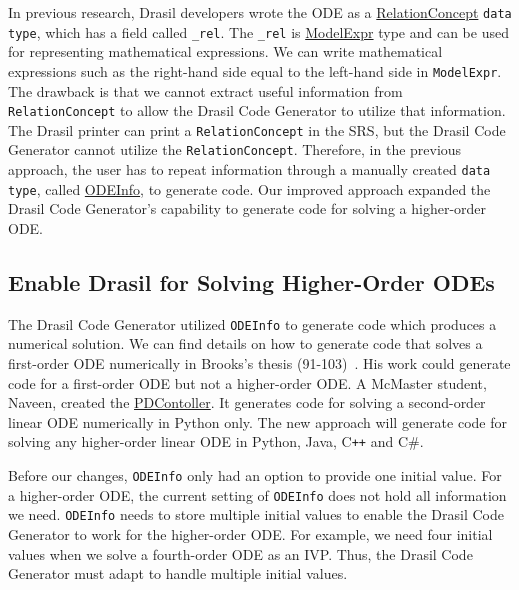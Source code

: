 In previous research, Drasil developers wrote the ODE as a \href{https://jacquescarette.github.io/Drasil/docs/full/drasil-lang-0.1.60.0/Language-Drasil-Chunk-Relation.html#t:RelationConcept}{RelationConcept} \verb|data type|, which has a field called \verb|_rel|. The \verb|_rel| is \href{https://jacquescarette.github.io/Drasil/docs/full/drasil-lang-0.1.60.0/Language-Drasil-ModelExpr-Lang.html#t:ModelExpr}{ModelExpr} type and can be used for representing mathematical expressions. We can write mathematical expressions such as the right-hand side equal to the left-hand side in \verb|ModelExpr|. The drawback is that we cannot extract useful information from \verb|RelationConcept| to allow the Drasil Code Generator to utilize that information. The Drasil printer can print a \verb|RelationConcept| in the SRS, but the Drasil Code Generator cannot utilize the \verb|RelationConcept|. Therefore, in the previous approach, the user has to repeat information through a manually created \verb|data type|, called \href{https://jacquescarette.github.io/Drasil/docs/drasil-code-0.1.9.0/Language-Drasil-Code.html#t:ODEInfo}{ODEInfo}, to generate code. Our improved approach expanded the Drasil Code Generator's capability to generate code for solving a higher-order ODE.

\subsection{Enable Drasil for Solving Higher-Order ODEs}
The Drasil Code Generator utilized \verb|ODEInfo| to generate code which produces a numerical solution. We can find details on how to generate code that solves a first-order ODE numerically in Brooks's thesis (91-103)~\citep{brooks}. His work could generate code for a first-order ODE but not a higher-order ODE. A McMaster student, Naveen, created the \href{https://jacquescarette.github.io/Drasil/examples/pdcontroller/SRS/srs/PDController_SRS.html}{PDContoller}. It generates code for solving a second-order linear ODE numerically in Python only. The new approach will generate code for solving any higher-order linear ODE in Python, Java, C\texttt{++} and C\#.

Before our changes, \verb|ODEInfo| only had an option to provide one initial value. For a higher-order ODE, the current setting of \verb|ODEInfo| does not hold all information we need. \verb|ODEInfo| needs to store multiple initial values to enable the Drasil Code Generator to work for the higher-order ODE. For example, we need four initial values when we solve a fourth-order ODE as an IVP. Thus, the Drasil Code Generator must adapt to handle multiple initial values.

